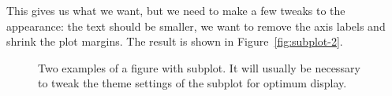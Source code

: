 % 


This gives us what we want, but we need to make a few tweaks to the appearance: the text should be smaller, we want to remove the axis labels and shrink the plot margins.  The result is shown in Figure~\ref{fig:subplot-2}.

% 
% 


\begin{figure}[htbp]
  \centering
  \caption{Two examples of a figure with subplot. It will usually be necessary to tweak the theme settings of the subplot for optimum display.}
  \label{fig:subplot}
\end{figure}

